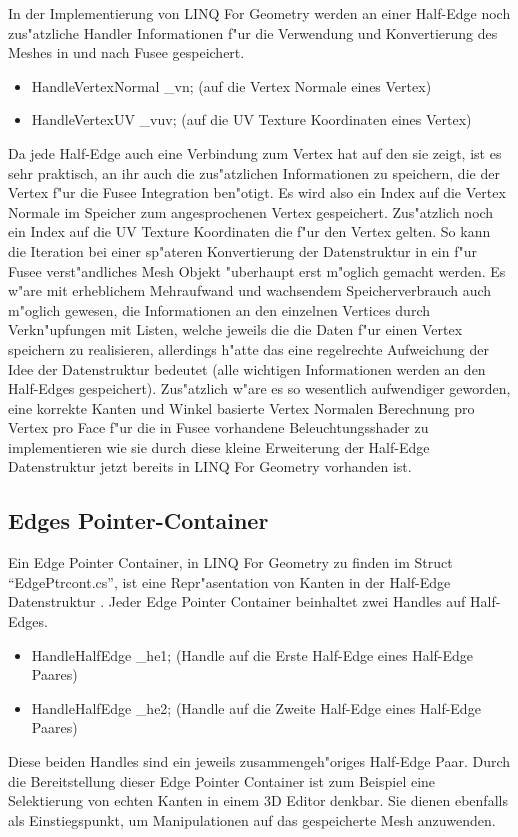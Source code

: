 \documentclass[pagesize, paper=a4, fontsize=12pt,titlepage=true, headings=small, headnosepline, abstractoff, liststotoc, nochapterprefix, plainheadsepline]{scrreprt}
\newcommand{\LFGS}{LINQ For Geometry }
\newcommand{\HES}{Half-Edge Datenstruktur }
\begin{document}
In der Implementierung von \LFGS werden an einer Half-Edge noch zus"atzliche Handler Informationen f"ur die Verwendung und Konvertierung des Meshes in und nach Fusee gespeichert.

\begin{itemize}
\item HandleVertexNormal \_vn; (auf die Vertex Normale eines Vertex)
\item HandleVertexUV \_vuv; (auf die UV Texture Koordinaten eines Vertex)
\end{itemize}

Da jede Half-Edge auch eine Verbindung zum Vertex hat auf den sie zeigt, ist es sehr praktisch, an ihr auch die zus"atzlichen Informationen zu speichern, die der Vertex f"ur die Fusee Integration  ben"otigt. Es wird also ein Index auf die Vertex Normale im Speicher zum angesprochenen Vertex gespeichert. Zus"atzlich noch ein Index auf die UV Texture Koordinaten die f"ur den Vertex gelten. So kann die Iteration bei einer sp"ateren Konvertierung der Datenstruktur in ein f"ur Fusee verst"andliches Mesh Objekt "uberhaupt erst m"oglich gemacht werden. Es w"are mit erheblichem Mehraufwand und wachsendem Speicherverbrauch auch m"oglich gewesen, die Informationen an den einzelnen Vertices durch Verkn"upfungen mit Listen, welche jeweils die die Daten f"ur einen Vertex speichern zu realisieren, allerdings h"atte das eine regelrechte Aufweichung der Idee der Datenstruktur bedeutet (alle wichtigen Informationen werden an den Half-Edges gespeichert). Zus"atzlich w"are es so wesentlich aufwendiger geworden, eine korrekte Kanten und Winkel basierte Vertex Normalen Berechnung pro Vertex pro Face f"ur die in Fusee vorhandene Beleuchtungsshader zu implementieren wie sie durch diese kleine Erweiterung der \HES jetzt bereits in \LFGS vorhanden ist.
		\subsection {Edges Pointer-Container}
			Ein Edge Pointer Container, in \LFGS zu finden im Struct "`EdgePtrcont.cs"', ist eine Repr"asentation von Kanten in der \HES. Jeder Edge Pointer Container beinhaltet zwei Handles auf Half-Edges.
\begin{itemize}
\item HandleHalfEdge \_he1; (Handle auf die Erste Half-Edge eines Half-Edge Paares)
\item HandleHalfEdge \_he2; (Handle auf die Zweite Half-Edge eines Half-Edge Paares)
\end{itemize}
Diese beiden Handles sind ein jeweils zusammengeh"origes Half-Edge Paar. Durch die Bereitstellung dieser Edge Pointer Container ist zum Beispiel eine Selektierung von echten Kanten in einem 3D Editor denkbar. Sie dienen ebenfalls als Einstiegspunkt, um Manipulationen auf das gespeicherte Mesh anzuwenden.
\end{document}
